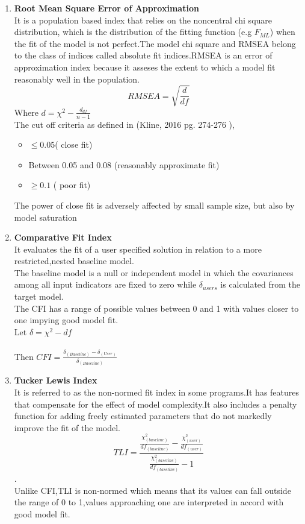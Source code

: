 \documentclass[12pt]{article}
\begin{document}
\begin{enumerate}
	\item \textbf{Root Mean Square Error of Approximation}\\
	It is a population based index that relies on the noncentral chi square distribution, which is the distribution of the fitting function (e.g $F_{ML}$) when the fit of the model is not perfect.The model chi square and RMSEA belong to the class of indices called absolute fit indices.RMSEA is an error of approximation index because it asseses the extent to which a model fit reasonably well in the population.\\$$RMSEA= \sqrt {\frac{d}{df}}$$
	Where $d= {\chi}^2-{\frac{d_{df}}{n-1}}$\\
	The cut off criteria as defined in (Kline, 2016 pg. 274-276 ),\\
	\begin{itemize}
		\item $\leq 0.05$( close fit)
		\item Between 0.05 and 0.08 (reasonably approximate fit)
		\item $\geq 0.1$ ( poor fit)
	\end{itemize}
	The power of close fit is adversely affected by small sample size, but also by model saturation
	\item \textbf{Comparative Fit Index}\\
	It evaluates the fit of a user specified solution in relation to a more restricted,nested baseline model.\\The baseline model is a null or independent model in which the covariances among all input indicators are fixed to zero while $\delta_{users}$ is calculated from the target model.\\ The CFI has a range of possible values between 0 and 1 with values closer to one impying good model fit.\\
	Let $\delta = {\chi}^2-{df}$\\\\
	Then $CFI =\frac{\delta_{(Baseline)}-\delta_{(User)}}{\delta_{(Baseline)}}$
	
	\item \textbf{Tucker Lewis Index}\\
	It is referred to as the non-normed fit index in some programs.It has features that compensate for the effect of model complexity.It also includes a penalty function for adding freely estimated parameters that do not markedly improve the fit of the model.
	$$TLI =\frac{\frac{{\chi}^2_{(baseline)}}{df_{(baseline)}}- \frac{{\chi}^2_{(user)}}{df_(user)}}{\frac{{\chi}^2_{( baseline)}}{df_(baseline)} -1}$$.\\
\noindent Unlike CFI,TLI is non-normed which means that its values can fall outside the range of 0 to 1,values approaching one are interpreted in accord with good model fit.

\end{enumerate}
\end{document}
